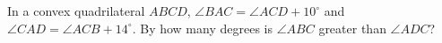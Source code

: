 In a convex quadrilateral $ABCD$, $\angle BAC=\angle ACD+10^{\circ}$ and $\angle CAD=\angle ACB+14^{\circ}$. By how many degrees is $\angle ABC$ greater than $\angle ADC$?
